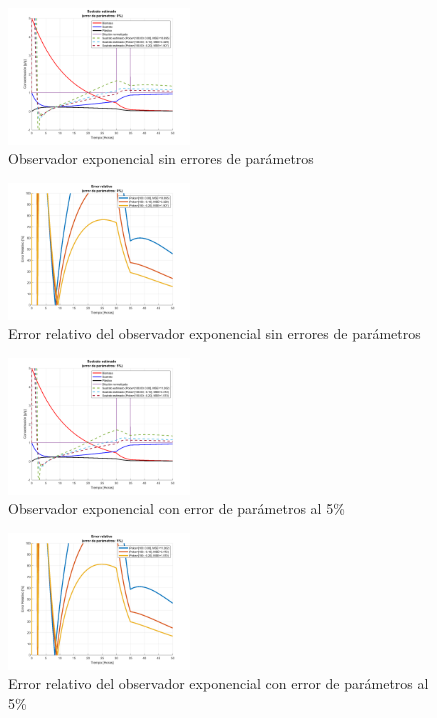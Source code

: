 \documentclass[letterpaper, 10 pt, conference]{ieeeconf}  %
\begin{document}
\begin{figure}[H]
  \centering
  \includegraphics[width=0.43\textwidth]{./Images_tp2/exponencial_1.png}
  \caption{Observador exponencial sin errores de parámetros}
\end{figure}

\begin{figure}[H]
  \centering
  \includegraphics[width=0.43\textwidth]{./Images_tp2/exponencial_1_error.png}
  \caption{Error relativo del observador exponencial sin errores de parámetros}
\end{figure}

\begin{figure}[H]
  \centering
  \includegraphics[width=0.43\textwidth]{./Images_tp2/exponencial_2.png}
  \caption{Observador exponencial con error de parámetros al 5\%}
\end{figure}

\begin{figure}[H]
  \centering
  \includegraphics[width=0.43\textwidth]{./Images_tp2/exponencial_2_error.png}
  \caption{Error relativo del observador exponencial con error de parámetros al 5\%}
\end{figure}
\end{document}
